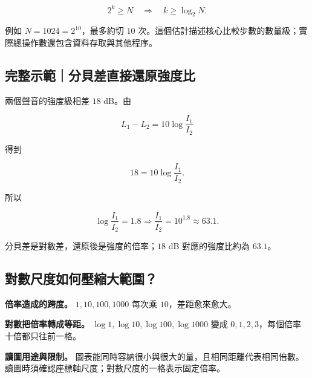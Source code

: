 \documentclass[11pt,a4paper]{article}
\begin{document}
\[
2^k\ge N
\quad\Longrightarrow\quad
k\ge\log_2N.
\]

例如 \(N=1024=2^{10}\)，最多約切 \(10\) 次。這個估計描述核心比較步數的數量級；實際總操作數還包含資料存取與其他程序。

\begin{HandoutWorkedExample}

\subsection{完整示範｜分貝差直接還原強度比}\label{ux5b8cux6574ux793aux7bc4ux5206ux8c9dux5deeux76f4ux63a5ux9084ux539fux5f37ux5ea6ux6bd4}

兩個聲音的強度級相差 \(18\) dB。由

\[
L_1-L_2=10\log\frac{I_1}{I_2}
\]

得到

\[
18=10\log\frac{I_1}{I_2}.
\]

所以

\[
\log\frac{I_1}{I_2}=1.8
\Longrightarrow
\boxed{\frac{I_1}{I_2}=10^{1.8}\approx63.1}.
\]

分貝差是對數差，還原後是強度的倍率；\(18\) dB 對應的強度比約為 \(63.1\)。

\end{HandoutWorkedExample}

\subsection{對數尺度如何壓縮大範圍？}\label{ux5c0dux6578ux5c3aux5ea6ux5982ux4f55ux58d3ux7e2eux5927ux7bc4ux570d}

\textbf{倍率造成的跨度。} \(1,10,100,1000\) 每次乘 \(10\)，差距愈來愈大。

\textbf{對數把倍率轉成等距。} \(\log1,\log10,\log100,\log1000\) 變成 \(0,1,2,3\)，每個倍率十倍都只往前一格。

\textbf{讀圖用途與限制。} 圖表能同時容納很小與很大的量，且相同距離代表相同倍數。讀圖時須確認座標軸尺度；對數尺度的一格表示固定倍率。
\end{document}

